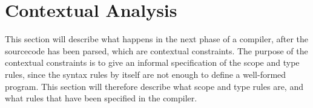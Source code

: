 \section{Contextual Analysis} \label{chap:contextual_analysis}

This section will describe what happens in the next phase of a compiler, 
after the sourcecode has been parsed, which are contextual constraints.
The purpose of the contextual constraints is to give an informal 
specification of the scope and type rules, since the syntax rules by itself
are not enough to define a well-formed program. This section
will therefore describe what scope and type rules are, and what rules that have 
been specified in the compiler.
